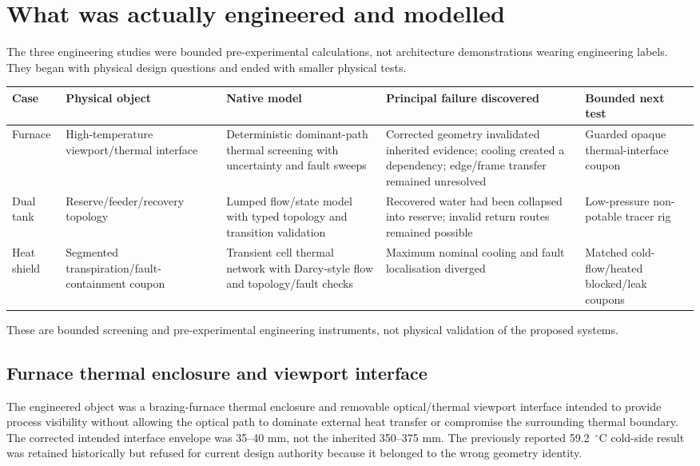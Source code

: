\section{What was actually engineered and modelled}

The three engineering studies were bounded pre-experimental calculations, not architecture demonstrations wearing engineering labels. They began with physical design questions and ended with smaller physical tests.

\begin{longtable}{L{0.11\textwidth}L{0.19\textwidth}L{0.25\textwidth}L{0.23\textwidth}L{0.15\textwidth}}
\toprule
\textbf{Case} & \textbf{Physical object} & \textbf{Native model} & \textbf{Principal failure discovered} & \textbf{Bounded next test}\\\midrule
Furnace & High-temperature viewport/thermal interface & Deterministic dominant-path thermal screening with uncertainty and fault sweeps & Corrected geometry invalidated inherited evidence; cooling created a dependency; edge/frame transfer remained unresolved & Guarded opaque thermal-interface coupon\\
Dual tank & Reserve/feeder/recovery topology & Lumped flow/state model with typed topology and transition validation & Recovered water had been collapsed into reserve; invalid return routes remained possible & Low-pressure non-potable tracer rig\\
Heat shield & Segmented transpiration/fault-containment coupon & Transient cell thermal network with Darcy-style flow and topology/fault checks & Maximum nominal cooling and fault localisation diverged & Matched cold-flow/heated blocked/leak coupons\\
\bottomrule
\end{longtable}

These are bounded screening and pre-experimental engineering instruments, not physical validation of the proposed systems.

\subsection{Furnace thermal enclosure and viewport interface}
The engineered object was a brazing-furnace thermal enclosure and removable optical/thermal viewport interface intended to provide process visibility without allowing the optical path to dominate external heat transfer or compromise the surrounding thermal boundary. The corrected intended interface envelope was 35--40 mm, not the inherited 350--375 mm. The previously reported 59.2~$^\circ$C cold-side result was retained historically but refused for current design authority because it belonged to the wrong geometry identity.

